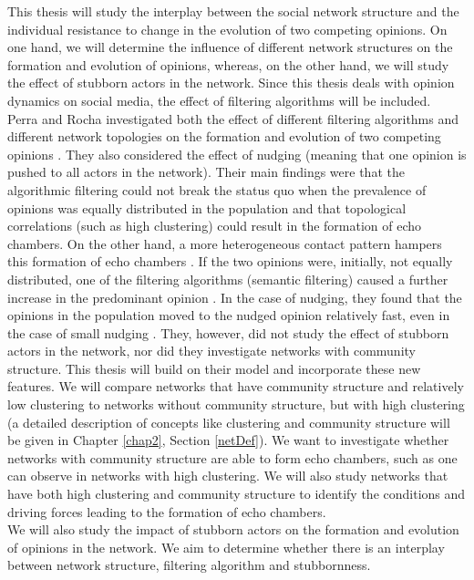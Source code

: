 \documentclass[11 pt , letterpaper , twoside , openright]{book}
\begin{document}
This thesis will study the interplay between the social network structure and the individual resistance to change in the evolution of two competing opinions. On one hand, we will determine the influence of different network structures on the formation and evolution of opinions, whereas, on the other hand, we will study the effect of stubborn actors in the network. Since this thesis deals with opinion dynamics on social media, the effect of filtering algorithms will be included.\\ 
\newline
Perra and Rocha investigated both the effect of different filtering algorithms and different network topologies on the formation and evolution of two competing opinions \cite{Perra2019}. They also considered the effect of nudging (meaning that one opinion is pushed to all actors in the network). Their main findings were that the algorithmic filtering could not break the status quo when the prevalence of opinions was equally distributed in the population and that topological correlations (such as high clustering) could result in the formation of echo chambers. On the other hand, a more heterogeneous contact pattern hampers this formation of echo chambers \cite{Perra2019}. If the two opinions were, initially, not equally distributed, one of the filtering algorithms (semantic filtering) caused a further increase in the predominant opinion \cite{Perra2019}. In the case of nudging, they found that the opinions in the population moved to the nudged opinion relatively fast, even in the case of small nudging \cite{Perra2019}. They, however, did not study the effect of stubborn actors in the network, nor did they investigate networks with community structure. This thesis will build on their model and incorporate these new features. We will compare networks that have community structure and relatively low clustering to networks without community structure, but with high clustering (a detailed description of concepts like clustering and community structure will be given in Chapter \ref{chap2}, Section \ref{netDef}). We want to investigate whether networks with community structure are able to form echo chambers, such as one can observe in networks with high clustering. We will also study networks that have both high clustering and community structure to identify the conditions and driving forces leading to the formation of echo chambers.\\
\newline
We will also study the impact of stubborn actors on the formation and evolution of opinions in the network. We aim to determine whether there is an interplay between network structure, filtering algorithm and stubbornness.
\end{document}
